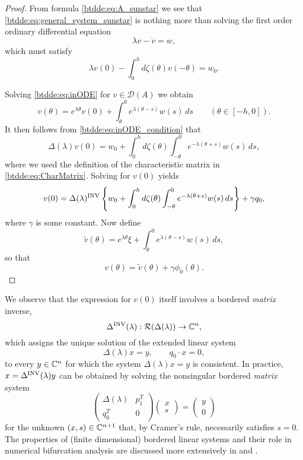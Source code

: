 \begin{proof}
From formula \cref{btdde:eq:A_sunstar} we see that \cref{btdde:eq:general_system_sunstar} is nothing more than solving the
first order ordinary differential equation 
\begin{equation}
    \label{btdde:eq:inODE}
    \lambda v-\dot{v} = w,
\end{equation}
which must satisfy
\begin{equation}
    \label{btdde:eq:inODE_condition}
    \lambda v(0)-\int_{0}^{h}d\zeta(\theta)v(-\theta) = w_0.
\end{equation}

Solving \cref{btdde:eq:inODE} for $v \in \mathcal D(A)$ we obtain
\[
v(\theta) = e^{\lambda\theta}v(0) + \int_{\theta}^{0}e^{\lambda(\theta-s)}w(s)\,ds\qquad\left(\theta\in[-h,0]\right).
\]
It then follows from \cref{btdde:eq:inODE_condition} that
\[
    \Delta(\lambda)v(0) = w_0 +\int_{0}^{h}d\zeta(\theta)\int_{-\theta}^0 e^{-\lambda (\theta + s)}w(s) \,ds,
\]
where we used the definition of the characteristic matrix in \cref{btdde:eq:CharMatrix}.
Solving for $v(0)$ yields
\[
v(0) = \Delta(\lambda)^{\mathrm{INV}}
        \left\{ w_0 +\int_{0}^{h}d\zeta(\theta)\int_{-\theta}^0 e^{-\lambda (\theta + s)}w(s) \,ds \right\} +\gamma q_{0},
\]
where $\gamma$ is some constant. Now define
\[
\tilde{v}(\theta) = e^{\lambda\theta}\xi + \int_{\theta}^{0}e^{\lambda(\theta-s)}w(s)\,ds,
\]
so that
\[
v(\theta) = \tilde{v}(\theta) + \gamma \phi_{0}(\theta).
\]
\end{proof}

\begin{remark}
We observe that the expression for $v(0)$ itself involves a bordered {\em matrix} inverse,
\[
\Delta^{\mathrm{INV}}(\lambda) : \mathcal{R}(\Delta(\lambda)) \to \mathbb{C}^n,
\]
which assigns the unique solution of the extended linear system
\[
  \Delta(\lambda)x = y, \qquad q_0 \cdot x = 0,
\]
to every $y \in \mathbb{C}^n$ for which the system $\Delta(\lambda)x = y$ is consistent. In practice, $x=\Delta^{\mathrm{INV}}(\lambda)y$ can be obtained by solving the nonsingular bordered \emph{matrix} system
\[
\begin{pmatrix}
\Delta(\lambda) & p_1^T \\
q_0^T & 0
\end{pmatrix}\begin{pmatrix}
x\\
s
\end{pmatrix}=\begin{pmatrix}
y\\
0
\end{pmatrix}
\]
for the unknown $(x,s) \in \mathbb{C}^{n+1}$ that, by Cramer's rule, necessarily
satisfies $s = 0$. The properties of (finite dimensional) bordered linear
systems and their role in numerical bifurcation analysis are discussed more
extensively in \cite{Keller1987Numerical} and \cite[Chapter
3]{govaerts2000numerical}.
\end{remark}

